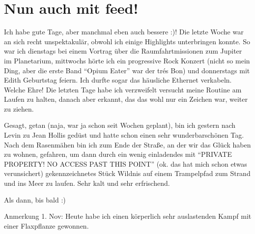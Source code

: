 \chapter{Nun auch mit feed!}

Ich habe gute Tage, aber manchmal eben auch bessere :)! Die letzte Woche
war an sich recht unspektakulär, obwohl ich einige Highlights
unterbringen konnte. So war ich dienstags bei einem Vortrag über die
Raumfahrtmissionen zum Jupiter im Planetarium, mittwochs hörte ich ein
progressive Rock Konzert (nicht so mein Ding, aber die erste Band
``Opium Eater'' war der trés Bon) und donnerstags mit Edith Geburtstag
feiern. Ich durfte sogar das häusliche Ethernet verkabeln. Welche Ehre!
Die letzten Tage habe ich verzweifelt versucht meine Routine am Laufen
zu halten, danach aber erkannt, das das wohl nur ein Zeichen war, weiter
zu ziehen.

Gesagt, getan (naja, war ja schon seit Wochen geplant), bin ich gestern
nach Levin zu Jean Hollis gedüst und hatte schon einen sehr
wunderbarschönen Tag. Nach dem Rasenmähen bin ich zum Ende der Straße,
an der wir das Glück haben zu wohnen, gefahren, um dann durch ein wenig
einladendes mit ``PRIVATE PROPERTY! NO ACCESS PAST THIS POINT'' (ok. das
hat mich schon etwas verunsichert) gekennzeichnetes Stück Wildnis auf
einem Trampelpfad zum Strand und ins Meer zu laufen. Sehr kalt und sehr
erfrischend.

Als dann, bis bald :)

Anmerkung 1. Nov: Heute habe ich einen körperlich sehr auslastenden
Kampf mit einer Flaxpflanze gewonnen.

